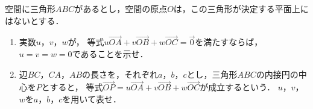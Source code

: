\documentclass[../../main.tex]{subfiles}
\begin{document}
空間に三角形$ABC$があるとし，空間の原点$O$は，この三角形が決定する平面上にはないとする．
\begin{enumerate}
  \item 実数$u$，$v$，$w$が，
    等式$u\overrightarrow{OA}+v\overrightarrow{OB}+w\overrightarrow{OC}=\vec{0}$を満たすならば，
    $u=v=w=0$であることを示せ．
  \item 辺$BC$，$CA$，$AB$の長さを，それぞれ$a$，$b$，$c$とし，三角形$ABC$の内接円の中心を$P$とすると，
    等式$\overrightarrow{OP}=u\overrightarrow{OA}+v\overrightarrow{OB}+w\overrightarrow{OC}$が成立するという．
    $u$，$v$，$w$を$a$，$b$，$c$を用いて表せ．
\end{enumerate}
\end{document}
